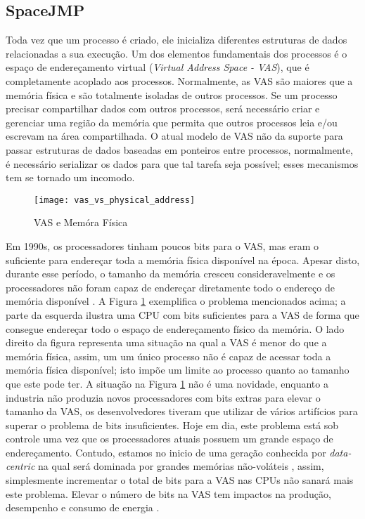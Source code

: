 \subsection{SpaceJMP}
\label{sec:mvas}

Toda vez que um processo é criado, ele inicializa diferentes estruturas de
dados relacionadas a sua execução. Um dos elementos fundamentais dos processos
é o espaço de endereçamento virtual (\emph{Virtual Address Space - VAS}), que é
completamente acoplado aos processos. Normalmente, as VAS são maiores que a
memória física e são totalmente isoladas de outros processos. Se um processo
precisar compartilhar dados com outros processos, será necessário criar e
gerenciar uma região da memória que permita que outros processos leia e/ou
escrevam na área compartilhada. O atual modelo de VAS não da suporte para
passar estruturas de dados baseadas em ponteiros entre processos, normalmente,
é necessário serializar os dados para que tal tarefa seja possível; esses
mecanismos tem se tornado um incomodo.

\begin{figure}[!h]
  \centering
  \texttt{[image: vas\_vs\_physical\_address]} 
  \caption{VAS e Memóra Física}
  \label{fig:vas_vs_physical} 
\end{figure}

Em 1990s, os processadores tinham poucos bits para o VAS, mas eram o suficiente
para endereçar toda a memória física disponível na época. Apesar disto, durante
esse período, o tamanho da memória cresceu consideravelmente e os processadores
não foram capaz de endereçar diretamente todo o endereço de memória disponível
\cite{crowley}. A Figura \ref{fig:vas_vs_physical} exemplifica o problema
mencionados acima; a parte da esquerda ilustra uma CPU com bits suficientes
para a VAS de forma que consegue endereçar todo o espaço de endereçamento
físico da memória. O lado direito da figura representa uma situação na qual a
VAS é menor do que a memória física, assim, um um único processo não é capaz de
acessar toda a memória física disponível; isto impõe um limite ao processo
quanto ao tamanho que este pode ter. A situação na Figura
\ref{fig:vas_vs_physical} não é uma novidade, enquanto a industria não produzia
novos processadores com bits extras para elevar o tamanho da VAS, os
desenvolvedores tiveram que utilizar de vários artifícios para superar o
problema de bits insuficientes. Hoje em dia, este problema está sob controle
uma vez que os processadores atuais possuem um grande espaço de endereçamento.
Contudo, estamos no inicio de uma geração conhecida por \emph{data-centric} na
qual será dominada por grandes memórias não-voláteis \citep{outlook}, assim,
simplesmente incrementar o total de bits para a VAS nas CPUs não sanará mais
este problema.  Elevar o número de bits na VAS tem impactos na produção,
desempenho e consumo de energia \citep{spacejmp}.

